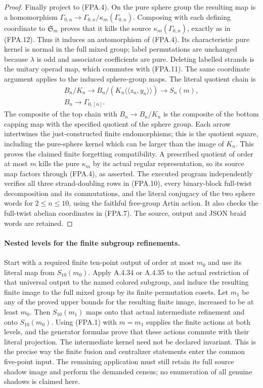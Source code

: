 \begin{proof}
Finally project to (FPA.4).  On the pure sphere group
the resulting map is a homomorphism
$\Gamma_{0,n}\to\Gamma_{0,n}/\kappa_m(\Gamma_{0,n})$.
Composing with each defining coordinate to
$\mathfrak S_m$ proves that it kills the source
$\kappa_m(\Gamma_{0,n})$, exactly as in (FPA.12).
Thus it induces an automorphism of (FPA.4).
Its characteristic pure kernel is normal in the full
mixed group; label permutations are unchanged because
$\lambda$ is odd and associator coefficients are pure.
Deleting labelled strands is the unitary operad map,
which commutes with (FPA.11).  The same coordinate
argument applies to the induced sphere-group maps.
The literal quotient chain is
\[
\begin{gathered}
 B_n/K_n\longrightarrow
 B_n/(K_n\langle\!\langle z_n,y_n\rangle\!\rangle)
 \longrightarrow S_n(m),\\
 B_n\longrightarrow\Gamma_{0,[n]}.
\end{gathered}
                                                               \tag{FPA.17}
\]
The composite of the top chain with $B_n\to B_n/K_n$
is the composite of the bottom capping map with the
specified quotient of the sphere group.  Each arrow
intertwines the just-constructed finite endomorphisms;
this is the quotient square, including the pure-sphere
kernel which can be larger than the image of $K_n$.
This proves the claimed finite forgetting compatibility.
A prescribed quotient of order at most $m$ kills the
pure $\kappa_m$ by its actual regular representation,
so its source map factors through (FPA.4), as asserted.
The executed program
independently verifies all three strand-doubling rows
in (FPA.10), every binary-block full-twist decomposition
and its commutations, and the literal conjugacy of the
two sphere words for $2\leq n\leq10$, using the faithful
free-group Artin action.  It also checks the full-twist
abelian coordinates in (FPA.7).  The source, output and
JSON braid words are retained.
\end{proof}

\paragraph{Nested levels for the finite subgroup refinements.}
Start with a required finite ten-point output of order
at most $m_0$ and use its literal map from $S_{10}(m_0)$.
Apply A.4.34 or A.4.35 to the actual restriction of that
universal output to the named colored subgroup, and
induce the resulting finite image to the full mixed
group by its finite permutation cosets.  Let $m_1$ be
any of the proved upper bounds for the resulting finite
image, increased to be at least $m_0$.
Then $S_{10}(m_1)$ maps onto that actual intermediate
refinement and onto $S_{10}(m_0)$.
Using (FPA.1) with $m=m_1$ supplies the finite actions
at both levels, and the generator formulas prove that
these actions commute with their literal projection.
The intermediate kernel need not be declared invariant.
This is the precise way the finite fusion and centralizer
statements enter the common five-point input.
The remaining application must still retain its full
source shadow image and perform the demanded census;
no enumeration of all genuine shadows is claimed here.
